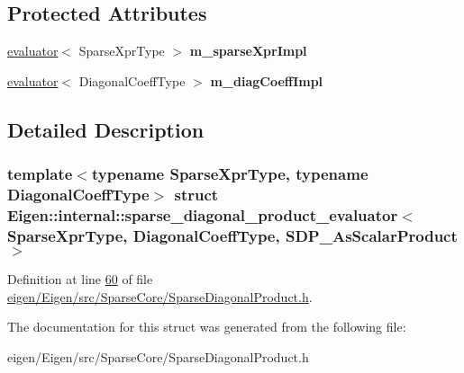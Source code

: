 \subsection*{Protected Attributes}
\begin{DoxyCompactItemize}
\item 
\mbox{\label{struct_eigen_1_1internal_1_1sparse__diagonal__product__evaluator_3_01_sparse_xpr_type_00_01_diag3ebd66799ce02a814119c716700b9642_a50d79438e0820226714a07be0fe39c61}} 
\hyperlink{struct_eigen_1_1internal_1_1evaluator}{evaluator}$<$ Sparse\+Xpr\+Type $>$ {\bfseries m\+\_\+sparse\+Xpr\+Impl}
\item 
\mbox{\label{struct_eigen_1_1internal_1_1sparse__diagonal__product__evaluator_3_01_sparse_xpr_type_00_01_diag3ebd66799ce02a814119c716700b9642_a73d1ae2a4731041d9f8b92c6038bfd2e}} 
\hyperlink{struct_eigen_1_1internal_1_1evaluator}{evaluator}$<$ Diagonal\+Coeff\+Type $>$ {\bfseries m\+\_\+diag\+Coeff\+Impl}
\end{DoxyCompactItemize}


\subsection{Detailed Description}
\subsubsection*{template$<$typename Sparse\+Xpr\+Type, typename Diagonal\+Coeff\+Type$>$\newline
struct Eigen\+::internal\+::sparse\+\_\+diagonal\+\_\+product\+\_\+evaluator$<$ Sparse\+Xpr\+Type, Diagonal\+Coeff\+Type, S\+D\+P\+\_\+\+As\+Scalar\+Product $>$}



Definition at line \hyperlink{eigen_2_eigen_2src_2_sparse_core_2_sparse_diagonal_product_8h_source_l00060}{60} of file \hyperlink{eigen_2_eigen_2src_2_sparse_core_2_sparse_diagonal_product_8h_source}{eigen/\+Eigen/src/\+Sparse\+Core/\+Sparse\+Diagonal\+Product.\+h}.



The documentation for this struct was generated from the following file\+:\begin{DoxyCompactItemize}
\item 
eigen/\+Eigen/src/\+Sparse\+Core/\+Sparse\+Diagonal\+Product.\+h\end{DoxyCompactItemize}

